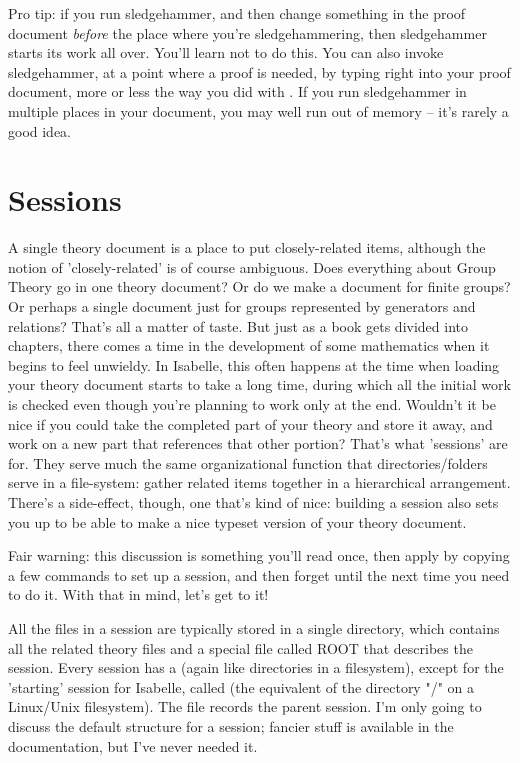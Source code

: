 Pro tip: if you run sledgehammer, and then change something in the proof document \textit{before} the place where you're sledgehammering, then sledgehammer starts its work all over. You'll learn not to do this. You can also invoke sledgehammer, at a point where a proof is needed, by typing  right into your proof document, more or less the way you did with . If you run sledgehammer in multiple places in your document, you may well run out of memory -- it's rarely a good idea. 

\section{Sessions}
\label{sec:sessions}
A single theory document is a place to put closely-related items, although the notion of 'closely-related' is of course ambiguous. Does everything about Group Theory go in one theory document? Or do we make a document for finite groups? Or perhaps a single document just for groups represented by generators and relations? That's all a matter of taste. But just as a book gets divided into chapters, there comes a time in the development of some mathematics when it begins to feel unwieldy. In Isabelle, this often happens at the time when loading your theory document starts to take a long time, during which all the initial work is checked even though you're planning to work only at the end. Wouldn't it be nice if you could take the completed part of your theory and store it away, and work on a new part that references that other portion? That's what 'sessions' are for. They serve much the same organizational function that directories/folders serve in a file-system: gather related items together in a hierarchical arrangement. There's a side-effect, though, one that's kind of nice: building a session also sets you up to be able to make a nice typeset version of your theory document. 

Fair warning: this discussion is something you'll read once, then apply by copying a few commands to set up a session, and then forget until the next time you need to do it. With that in mind, let's get to it!

All the files in a session are typically stored in a single directory, which contains all the related theory files and a special file called ROOT that describes the session. Every session has a  (again like directories in a filesystem), except for the 'starting' session for Isabelle, called  (the equivalent of the directory "/" on a Linux/Unix filesystem). The  file records the parent session. I'm only going to discuss the default structure for a session; fancier stuff is available in the documentation, but I've never needed it. 

